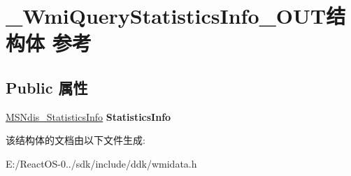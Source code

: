 \hypertarget{struct___wmi_query_statistics_info___o_u_t}{}\section{\+\_\+\+Wmi\+Query\+Statistics\+Info\+\_\+\+O\+U\+T结构体 参考}
\label{struct___wmi_query_statistics_info___o_u_t}
\subsection*{Public 属性}
\begin{DoxyCompactItemize}
\item 
\mbox{\label{struct___wmi_query_statistics_info___o_u_t_a2c0bb1e7f0994cb51c6c0dc0f913493e}} 
\hyperlink{struct___m_s_ndis___statistics_info}{M\+S\+Ndis\+\_\+\+Statistics\+Info} {\bfseries Statistics\+Info}
\end{DoxyCompactItemize}


该结构体的文档由以下文件生成\+:\begin{DoxyCompactItemize}
\item 
E\+:/\+React\+O\+S-\/0../sdk/include/ddk/wmidata.\+h\end{DoxyCompactItemize}
